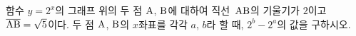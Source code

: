 함수 $y=2^{x}$의 그래프 위의 두 점 $\mathrm{A}$, $\mathrm{B}$에 대하여 직선~$\mathrm{AB}$의 기울기가 $2$이고 $\overline{\mathrm{AB}}=\sqrt{5}$이다. 두 점 $\mathrm{A}$, $\mathrm{B}$의 $x$좌표를 각각 $a$, $b$라 할 때, $2^{b}-2^{a}$의 값을 구하시오. 
